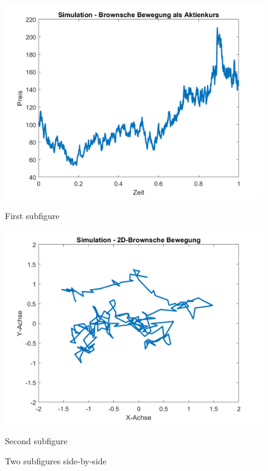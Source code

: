 \begin{figure}
	\centering
	\begin{minipage}{0.45\textwidth}
		\centering
		\includegraphics[width=\linewidth]{papers/brown/images/Aktienkurs-als-Brownische-Bewegung_2.png}
		\caption{First subfigure}
	\end{minipage}
	\hspace{0.05\linewidth}
	\begin{minipage}{0.45\textwidth}
		\centering
		\includegraphics[width=\linewidth]{papers/brown/images/Brownische-Bewegung-Simuliert_2.png}
		\caption{Second subfigure}
	\end{minipage}
	\caption{Two subfigures side-by-side}
\end{figure}

